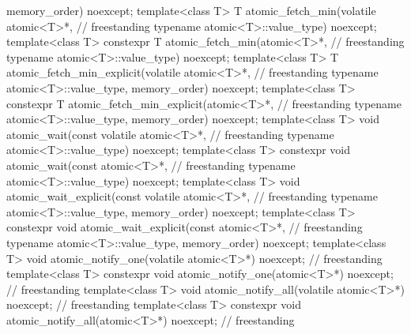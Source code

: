 \begin{codeblock}
{                                          memory_order) noexcept;
  template<class T>
    T atomic_fetch_min(volatile atomic<T>*,                                         // freestanding
                       typename atomic<T>::value_type) noexcept;
  template<class T>
    constexpr T atomic_fetch_min(atomic<T>*,                                        // freestanding
                                 typename atomic<T>::value_type) noexcept;
  template<class T>
    T atomic_fetch_min_explicit(volatile atomic<T>*,                                // freestanding
                                typename atomic<T>::value_type,
                                memory_order) noexcept;
  template<class T>
    constexpr T atomic_fetch_min_explicit(atomic<T>*,                               // freestanding
                                          typename atomic<T>::value_type,
                                          memory_order) noexcept;
  template<class T>
    void atomic_wait(const volatile atomic<T>*,                                     // freestanding
	             typename atomic<T>::value_type) noexcept;
  template<class T>
    constexpr void atomic_wait(const atomic<T>*,                                    // freestanding
                               typename atomic<T>::value_type) noexcept;
  template<class T>
    void atomic_wait_explicit(const volatile atomic<T>*,                            // freestanding
                              typename atomic<T>::value_type,
                              memory_order) noexcept;
  template<class T>
    constexpr void atomic_wait_explicit(const atomic<T>*,                           // freestanding
                                        typename atomic<T>::value_type,
                                        memory_order) noexcept;
  template<class T>
    void atomic_notify_one(volatile atomic<T>*) noexcept;                           // freestanding
  template<class T>
    constexpr void atomic_notify_one(atomic<T>*) noexcept;                          // freestanding
  template<class T>
    void atomic_notify_all(volatile atomic<T>*) noexcept;                           // freestanding
  template<class T>
    constexpr void atomic_notify_all(atomic<T>*) noexcept;                          // freestanding

}
\end{codeblock}
